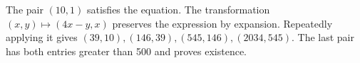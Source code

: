 The pair $(10,1)$ satisfies the equation. The transformation $(x,y)\mapsto(4x-y,x)$ preserves the expression by expansion. Repeatedly applying it gives $(39,10),(146,39),(545,146),(2034,545)$. The last pair has both entries greater than 500 and proves existence.
